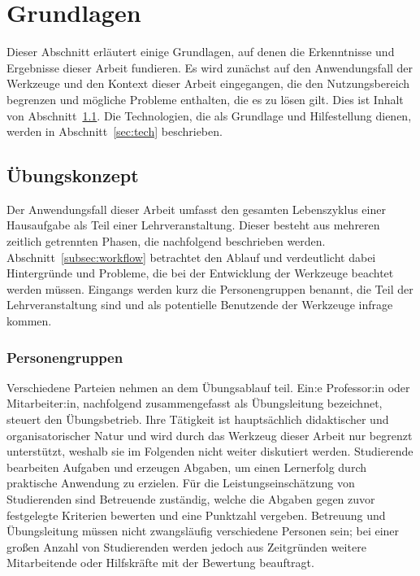 \chapter{Grundlagen}\label{ch:basics}

Dieser Abschnitt erläutert einige Grundlagen, auf denen die Erkenntnisse und Ergebnisse dieser Arbeit fundieren.
Es wird zunächst auf den Anwendungsfall der Werkzeuge und den Kontext dieser Arbeit eingegangen, die den Nutzungsbereich begrenzen und mögliche Probleme enthalten, die es zu lösen gilt.
Dies ist Inhalt von Abschnitt~\ref{sec:programming-assignments}.
Die Technologien, die als Grundlage und Hilfestellung dienen, werden in Abschnitt~\ref{sec:tech} beschrieben.

\section{Übungskonzept}\label{sec:programming-assignments}

Der Anwendungsfall dieser Arbeit umfasst den gesamten Lebenszyklus einer Hausaufgabe als Teil einer Lehrveranstaltung.
Dieser besteht aus mehreren zeitlich getrennten Phasen, die nachfolgend beschrieben werden.
Abschnitt~\ref{subsec:workflow} betrachtet den Ablauf und verdeutlicht dabei Hintergründe und Probleme, die bei der Entwicklung der Werkzeuge beachtet werden müssen.
Eingangs werden kurz die Personengruppen benannt, die Teil der Lehrveranstaltung sind und als potentielle Benutzende der Werkzeuge infrage kommen.

\subsection{Personengruppen}\label{subsec:people}

Verschiedene Parteien nehmen an dem Übungsablauf teil.
Ein:e Professor:in oder Mitarbeiter:in, nachfolgend zusammengefasst als Übungsleitung bezeichnet, steuert den Übungsbetrieb. %
Ihre Tätigkeit ist hauptsächlich didaktischer und organisatorischer Natur und wird durch das Werkzeug dieser Arbeit nur begrenzt unterstützt, weshalb sie im Folgenden nicht weiter diskutiert werden.
Studierende bearbeiten Aufgaben und erzeugen Abgaben, um einen Lernerfolg durch praktische Anwendung zu erzielen.
Für die Leistungseinschätzung von Studierenden sind Betreuende zuständig, welche die Abgaben gegen zuvor festgelegte Kriterien bewerten und eine Punktzahl vergeben.
Betreuung und Übungsleitung müssen nicht zwangsläufig verschiedene Personen sein;
bei einer großen Anzahl von Studierenden werden jedoch aus Zeitgründen weitere Mitarbeitende oder Hilfskräfte mit der Bewertung beauftragt.

